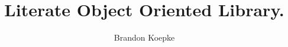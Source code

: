\usepackage[margin=1in]{geometry}
\usepackage{noweb}
\pagestyle{noweb}
\noweboptions{}
\title{Literate Object Oriented Library.}
\author{Brandon Koepke}

